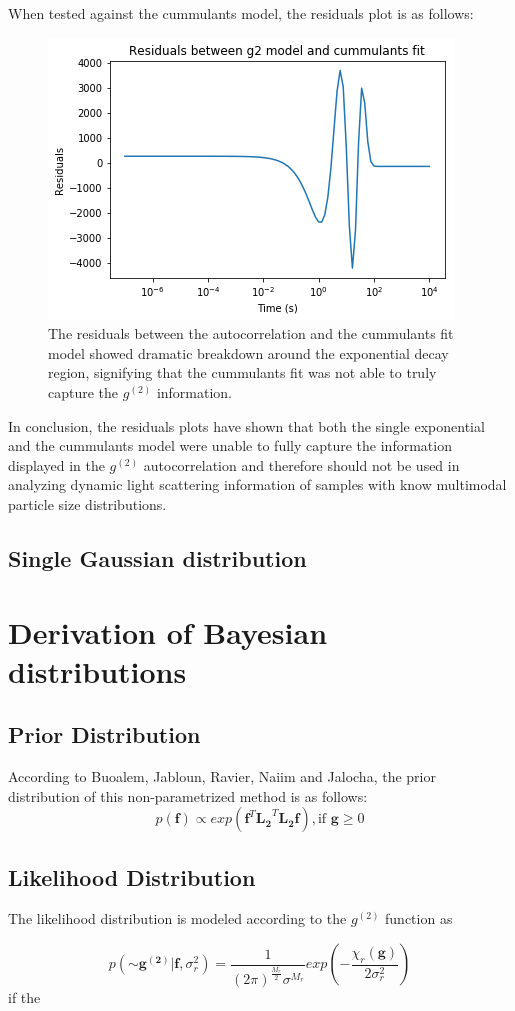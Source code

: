 \documentclass[11pt]{article}
\begin{document}
When tested against the cummulants model, the residuals plot is as follows:

\begin{figure}[h!]
\centering
\includegraphics[width=0.5\linewidth]{cummulants_fit_residuals.png}
\caption{The residuals between the autocorrelation and the cummulants fit model showed dramatic breakdown around the exponential decay region, signifying that the cummulants fit was not able to truly capture the $g^{(2)}$ information.}
\label{fig:cummulants_residuals}
\end{figure}

In conclusion, the residuals plots have shown that both the single exponential and the cummulants model were unable to fully capture the information displayed in the $g^{(2)}$ autocorrelation and therefore should not be used in analyzing dynamic light scattering information of samples with know multimodal particle size distributions. 

\subsection{Single Gaussian distribution}

\section{Derivation of Bayesian distributions}
\subsection{Prior Distribution}
According to Buoalem, Jabloun, Ravier, Naiim and Jalocha, the prior distribution of this non-parametrized method is as follows:
\begin{equation}
p(\mathbf{f}) \propto exp\left( \mathbf{f}^{T} \mathbf{L_2}^{T}\mathbf{L_2}\mathbf{f} \right), \textrm{if } \mathbf{g} \geq 0
\end{equation}

\subsection{Likelihood Distribution}
The likelihood distribution is modeled according to the $g^{(2)}$ function as 

\begin{equation}
p(\mathbf{\sim{g^{(2)}}} | \mathbf{f}, \sigma^{2}_r ) = \frac{1}{{(2\pi)}^{\frac{M_r}{2}} \sigma^{M_r}}exp\left( -\frac{\chi_r(\mathbf{g})}{2\sigma^2_r}\right)
\end{equation}
if the 
\end{document}
